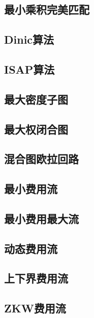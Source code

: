 \documentclass{article}
\begin{document}
\subsection{最小乘积完美匹配} 


\subsection{Dinic算法} 

\subsection{ISAP算法} 

\subsection{最大密度子图} 

\subsection{最大权闭合图} 

\subsection{混合图欧拉回路} 


\subsection{最小费用流} 

\subsection{最小费用最大流} 

\subsection{动态费用流} 

\subsection{上下界费用流} 


\subsection{ZKW费用流} 

\end{document}
